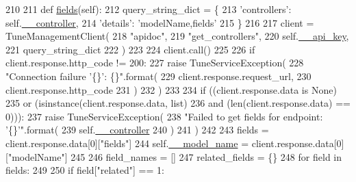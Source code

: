\begin{DoxyCode}
210 
211     \textcolor{keyword}{def }\hyperlink{classtune_1_1management_1_1endpoints_1_1base_1_1TuneManagementBase_abf3e64564de650a15b23f5be8b9d8058}{fields}(self):
212         query\_string\_dict = \{
213                 \textcolor{stringliteral}{'controllers'}: self.\hyperlink{classtune_1_1management_1_1endpoints_1_1base_1_1TuneManagementBase_a7eb2a74b2e4271de8b86758a20dfcb98}{\_\_controller},
214                 \textcolor{stringliteral}{'details'}: \textcolor{stringliteral}{'modelName,fields'}
215             \}
216 
217         client = TuneManagementClient(
218             \textcolor{stringliteral}{"apidoc"},
219             \textcolor{stringliteral}{"get\_controllers"},
220             self.\hyperlink{classtune_1_1management_1_1endpoints_1_1base_1_1TuneManagementBase_a402a65f71acc926f4ffdda120822dbe8}{\_\_api\_key},
221             query\_string\_dict
222             )
223 
224         client.call()
225 
226         \textcolor{keywordflow}{if} client.response.http\_code != 200:
227             \textcolor{keywordflow}{raise} TuneServiceException(
228                     \textcolor{stringliteral}{"Connection failure '\{\}': \{\}"}.format(
229                         client.response.request\_url,
230                         client.response.http\_code
231                     )
232                 )
233 
234         \textcolor{keywordflow}{if} ((client.response.data \textcolor{keywordflow}{is} \textcolor{keywordtype}{None})
235             \textcolor{keywordflow}{or} (isinstance(client.response.data, list)
236                 \textcolor{keywordflow}{and} (len(client.response.data) == 0))):
237             \textcolor{keywordflow}{raise} TuneServiceException(
238                     \textcolor{stringliteral}{"Failed to get fields for endpoint: '\{\}'"}.format(
239                        self.\hyperlink{classtune_1_1management_1_1endpoints_1_1base_1_1TuneManagementBase_a7eb2a74b2e4271de8b86758a20dfcb98}{\_\_controller}
240                     )
241                 )
242 
243         fields = client.response.data[0][\textcolor{stringliteral}{"fields"}]
244         self.\hyperlink{classtune_1_1management_1_1endpoints_1_1base_1_1TuneManagementBase_aa45c1144a2f1adf38d534562f69f49f0}{\_\_model\_name} = client.response.data[0][\textcolor{stringliteral}{"modelName"}]
245 
246         field\_names = []
247         related\_fields = \{\}
248         \textcolor{keywordflow}{for} field \textcolor{keywordflow}{in} fields:
249 
250             \textcolor{keywordflow}{if} field[\textcolor{stringliteral}{"related"}] == 1:

\end{DoxyCode}
